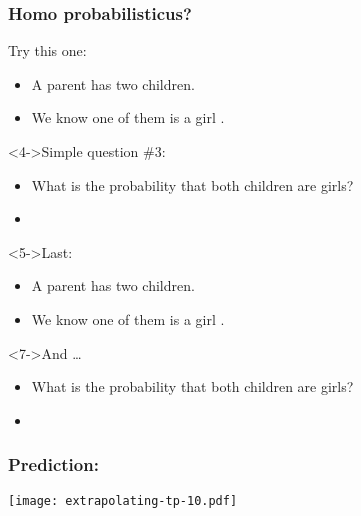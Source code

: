\begin{frame}
  \frametitle{Homo probabilisticus?}

  \begin{block}{Try this one:}
    \begin{itemize}
    \item<2->
      A parent has two children.
    \item<3->
      We know one of them is a girl .
    \end{itemize}
  \end{block}
  
  \begin{block}<4->{Simple question \#3:}
    \begin{itemize}
    \item<4->
      What is the probability that both
      children are girls?
    \item<8-| handout:0| trans:0>
    \end{itemize}
  \end{block}

  \begin{block}<5->{Last:}
    \begin{itemize}
    \item<5->
      A parent has two children.
    \item<6->
      We know one of them is a girl .
    \end{itemize}
  \end{block}
  
  \begin{block}<7->{And \ldots}
    \begin{itemize}
    \item<7->
      What is the probability that both
      children are girls?
    \item<9-| handout:0| trans:0>
    \end{itemize}
  \end{block}

  

\end{frame}

\begin{frame}
  \frametitle{Prediction:}

  \texttt{[image: extrapolating-tp-10.pdf]}\\

\end{frame}



